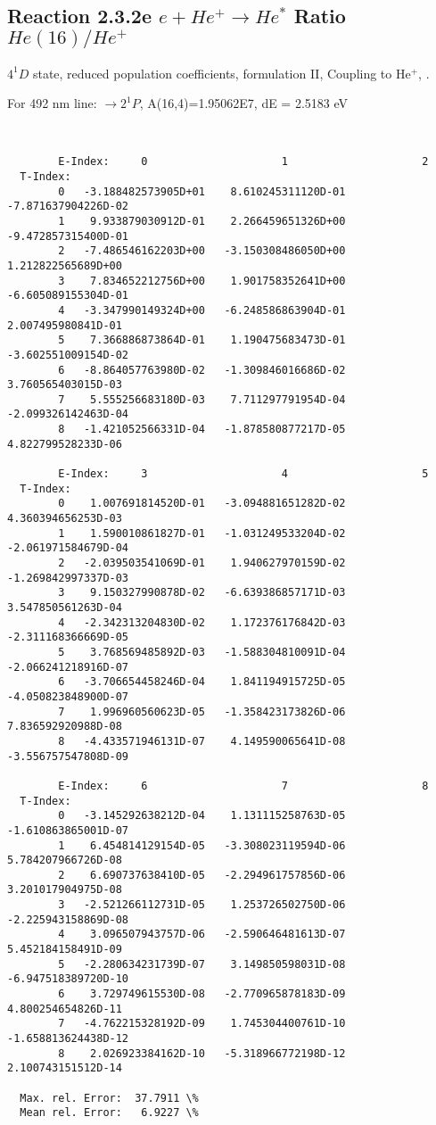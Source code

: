 \documentclass[12pt,dvipdfmx]{article}
\begin{document}
\subsection{
  Reaction 2.3.2e $e + He^+ \rightarrow He^*  $ Ratio $He(16)/He^+$
}

  $4^1D$ state,
  reduced population coefficients, formulation II,
  Coupling to He$^+$, \cite{kn:Fujimoto}.

  For 492 nm line: $\rightarrow 2^1P$, A(16,4)=1.95062E7, dE = 2.5183 eV

\begin{small}\begin{verbatim}


        E-Index:     0                     1                     2
  T-Index:
        0   -3.188482573905D+01    8.610245311120D-01   -7.871637904226D-02
        1    9.933879030912D-01    2.266459651326D+00   -9.472857315400D-01
        2   -7.486546162203D+00   -3.150308486050D+00    1.212822565689D+00
        3    7.834652212756D+00    1.901758352641D+00   -6.605089155304D-01
        4   -3.347990149324D+00   -6.248586863904D-01    2.007495980841D-01
        5    7.366886873864D-01    1.190475683473D-01   -3.602551009154D-02
        6   -8.864057763980D-02   -1.309846016686D-02    3.760565403015D-03
        7    5.555256683180D-03    7.711297791954D-04   -2.099326142463D-04
        8   -1.421052566331D-04   -1.878580877217D-05    4.822799528233D-06

        E-Index:     3                     4                     5
  T-Index:
        0    1.007691814520D-01   -3.094881651282D-02    4.360394656253D-03
        1    1.590010861827D-01   -1.031249533204D-02   -2.061971584679D-04
        2   -2.039503541069D-01    1.940627970159D-02   -1.269842997337D-03
        3    9.150327990878D-02   -6.639386857171D-03    3.547850561263D-04
        4   -2.342313204830D-02    1.172376176842D-03   -2.311168366669D-05
        5    3.768569485892D-03   -1.588304810091D-04   -2.066241218916D-07
        6   -3.706654458246D-04    1.841194915725D-05   -4.050823848900D-07
        7    1.996960560623D-05   -1.358423173826D-06    7.836592920988D-08
        8   -4.433571946131D-07    4.149590065641D-08   -3.556757547808D-09

        E-Index:     6                     7                     8
  T-Index:
        0   -3.145292638212D-04    1.131115258763D-05   -1.610863865001D-07
        1    6.454814129154D-05   -3.308023119594D-06    5.784207966726D-08
        2    6.690737638410D-05   -2.294961757856D-06    3.201017904975D-08
        3   -2.521266112731D-05    1.253726502750D-06   -2.225943158869D-08
        4    3.096507943757D-06   -2.590646481613D-07    5.452184158491D-09
        5   -2.280634231739D-07    3.149850598031D-08   -6.947518389720D-10
        6    3.729749615530D-08   -2.770965878183D-09    4.800254654826D-11
        7   -4.762215328192D-09    1.745304400761D-10   -1.658813624438D-12
        8    2.026923384162D-10   -5.318966772198D-12    2.100743151512D-14

  Max. rel. Error:  37.7911 \%
  Mean rel. Error:   6.9227 \%



\end{verbatim}\end{small}
\end{document}
